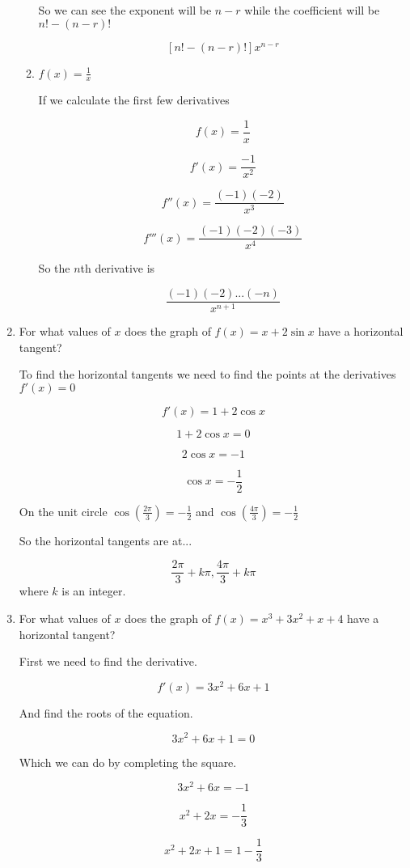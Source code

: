 \documentclass{article}
\begin{document}
\begin{enumerate}
\begin{enumerate}
			So we can see the exponent will be $n-r$ while the
			coefficient will be $n! - (n-r)!$

			$$[n! - (n-r)!]x^{n-r}$$

			\item $f(x) = \frac{1}{x}$

			If we calculate the first few derivatives

			$$f(x) = \frac{1}{x}$$

			$$f'(x) = \frac{-1}{x^2}$$

			$$f''(x) = \frac{(-1)(-2)}{x^{3}}$$

			$$f'''(x) = \frac{(-1)(-2)(-3)}{x^{4}}$$

			So the $n$th derivative is

			
			$$\frac{(-1)(-2)...(-n)}{x^{n+1}}$$
		\end{enumerate}

		\item For what values of $x$ does the graph of $f(x) = x + 2\sin x$
			have a horizontal tangent?

			To find the horizontal tangents we need to find the points at
			the derivatives $f'(x) = 0$

			$$f'(x) = 1 + 2\cos x$$

			$$1 + 2\cos x = 0$$

			$$2 \cos x = -1$$

			$$\cos x = - \frac{1}{2}$$

			On the unit circle $\cos (\frac{2\pi}{3}) = -\frac{1}{2}$ and
			$\cos (\frac{4\pi}{3}) = -\frac{1}{2}$

			So the horizontal tangents are at...

			$$\frac{2\pi}{3} + k\pi, \frac{4\pi}{3} + k\pi$$ where $k$ is
			an integer.

		\item For what values of $x$ does the graph of 
			$f(x) = x^3 + 3x^2 + x + 4$ have a horizontal tangent?

			First we need to find the derivative.

			$$f'(x) = 3x^2 + 6x + 1$$

			And find the roots of the equation.

			$$3x^2 + 6x + 1 = 0$$

			Which we can do by completing the square.

			$$3x^2 + 6x = -1$$

			$$x^2 + 2x = -\frac{1}{3}$$

			$$x^2 + 2x + 1 = 1 - \frac{1}{3}$$


\end{enumerate}
\end{document}
